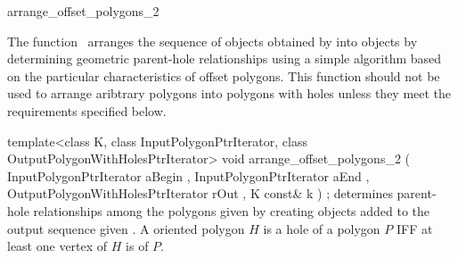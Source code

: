 

\begin{ccRefFunction}{arrange_offset_polygons_2}


\ccDefinition

The function \ccRefName\ arranges the sequence of  objects obtained by  into  objects by determining geometric parent-hole relationships using a simple algorithm based on the particular characteristics of offset polygons. This function should not be used to arrange aribtrary polygons into polygons with holes unless they meet the requirements specified below.


\ccFunction
{template<class K, class InputPolygonPtrIterator, class OutputPolygonWithHolesPtrIterator>
void arrange_offset_polygons_2 ( InputPolygonPtrIterator           aBegin
                               , InputPolygonPtrIterator           aEnd
                               , OutputPolygonWithHolesPtrIterator rOut
                               , K const&                          k  
                               ) ;
}
{determines parent-hole relationships among the polygons given by  creating 
 objects added to the output sequence given .
A  oriented polygon $H$ is a hole of a  polygon $P$ IFF at least one vertex of $H$ is  of $P$.
}

\ccRequirements


\end{ccRefFunction}
